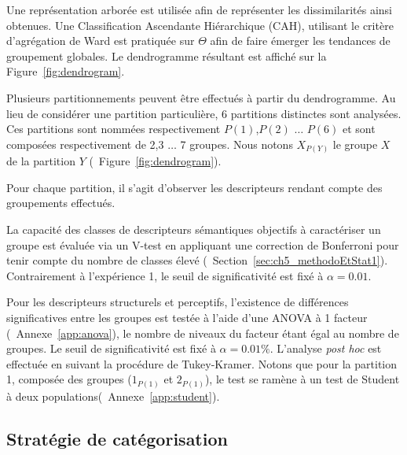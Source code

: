 Une représentation arborée est utilisée afin de représenter les dissimilarités ainsi obtenues. Une Classification Ascendante Hiérarchique (CAH), utilisant le critère d’agrégation de Ward est pratiquée sur $\Theta$ afin de faire émerger les tendances de groupement globales. Le dendrogramme résultant est affiché sur la Figure~\ref{fig:dendrogram}. 

Plusieurs partitionnements peuvent être effectués à partir du dendrogramme. Au lieu de considérer une partition particulière, 6  partitions distinctes sont analysées. Ces partitions sont nommées respectivement $P(1)$,$P(2)$ $\ldots$ $P(6)$ et sont composées respectivement de 2,3 $\ldots$ 7 groupes. Nous notons $X_{P(Y)}$ le groupe $X$ de la partition $Y$ (\cf~Figure~\ref{fig:dendrogram}).

Pour chaque partition, il s'agit d'observer les descripteurs rendant compte des groupements effectués. 

La capacité des classes  de descripteurs sémantiques objectifs  à caractériser un groupe est évaluée via un V-test en appliquant une correction de Bonferroni pour tenir compte du nombre de classes  élevé (\cf~Section~\ref{sec:ch5_methodoEtStat1}). Contrairement à l'expérience 1, le seuil de significativité est fixé à $\alpha=0.01$.

Pour les descripteurs structurels et perceptifs, l'existence de différences significatives entre les groupes est testée à l'aide d'une ANOVA à 1 facteur (\cf~Annexe~\ref{app:anova}), le nombre de niveaux du facteur étant égal au nombre de groupes. Le seuil de significativité est fixé à $\alpha=0.01\%$. L'analyse \emph{post hoc} est effectuée en suivant la procédure de Tukey-Kramer. Notons que pour la partition 1, composée des groupes ($1_{P(1)}$ et $2_{P(1)}$), le test se ramène à un test de Student à deux populations(\cf~Annexe~\ref{app:student}).

\subsection{Stratégie de catégorisation}

